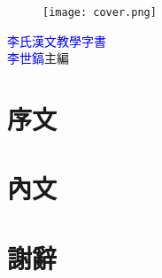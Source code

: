 \documentclass[a5paper,11pt]{article}
\begin{document}
\begin{titlepage}
\doublespacing
\begin{wrapfigure}{r}{50mm}
\texttt{[image: cover.png]}
\end{wrapfigure}
\hfill
\vfill
{\Huge\textcolor{blue}{李氏漢文教學字書}}\\
{\textcolor{blue}{李世鎬}\hspace{14pt}主編}
\vspace{64pt}
\end{titlepage}

\chapter*{序文}
\doublespacing


\chapter*{內文}
\begin{multicols}{3}
\onehalfspacing

\end{multicols}

\chapter*{謝辭}
\doublespacing

\end{document}
